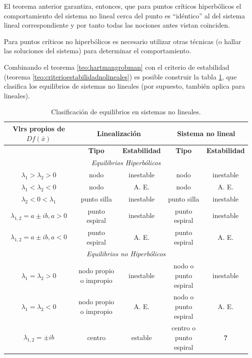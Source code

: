 \documentclass[11pt]{book}
\theoremstyle{definition}
\numberwithin{definition}{section}
\theoremstyle{theorem}
\numberwithin{theorem}{section}
\numberwithin{lemma}{section}
\numberwithin{corollary}{section}
\theoremstyle{plain}
\numberwithin{example}{section}
\begin{document}
El teorema anterior garantiza, entonces, que para puntos críticos hiperbólicos el comportamiento del sistema no lineal cerca del punto es ``idéntico'' al del sistema lineal correspondiente y por tanto todas las nociones antes vistan coinciden.

Para puntos críticos no hiperbólicos es necesario utilizar otras técnicas (o hallar las soluciones del sistema) para determinar el comportamiento.

Combinando el teorema \ref{teo:hartmangrobman} con el criterio de estabilidad (teorema \ref{teo:criterioestabilidadnolineales}) es posible construir la tabla \ref{tab:clasificacionequilibrios}, que clasifica los equilibrios de sistemas no lineales (por supuesto, también aplica para lineales).

\begin{table}[ht!]
	\begin{tabular}{|c|c|c|c|c|}
		\hline
		\textbf{Vlrs propios de $Df(\bar{x})$} & \multicolumn{2}{|c|}{\textbf{Linealización}} & \multicolumn{2}{|c|}{\textbf{Sistema no lineal}} \\
		\hline
		 & \textbf{Tipo} &\textbf{Estabilidad} & \textbf{Tipo} & \textbf{Estabilidad} \\
		\hline
		\multicolumn{5}{|c|}{\textit{Equilibrios Hiperbólicos}} \\
		\hline
		$\lambda_1 > \lambda_2 > 0$ & nodo & inestable & nodo & inestable \\
		$\lambda_1 < \lambda_2 < 0$ & nodo & A. E. & nodo & A. E. \\
		$\lambda_2 < 0 < \lambda_1$ & punto silla & inestable & punto silla & inestable \\
		$\lambda_{1,2} = a \pm ib, a > 0$ & punto espiral & inestable & punto espiral & inestable \\
		$\lambda_{1,2} = a \pm ib, a < 0$ & punto espiral & A. E. & punto espiral & A. E. \\

		\hline
		\multicolumn{5}{|c|}{\textit{Equilibrios no Hiperbólicos}} \\
		\hline
		$\lambda_1 = \lambda_2 >0$ & nodo propio o impropio & inestable & nodo o punto espiral & inestable \\
		$\lambda_1 = \lambda_2 < 0$ & nodo propio o impropio & A. E. & nodo o punto espiral & A. E. \\
		$\lambda_{1,2} = \pm ib$ & centro & estable & centro o punto espiral & \textbf{?} \\
		\hline
	\end{tabular}
	\label{tab:clasificacionequilibrios}
	\caption{Clasificación de equilibrios en sistemas no lineales.}
\end{table}
\end{document}
